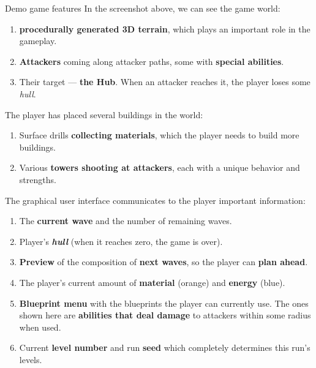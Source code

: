 \documentclass[portrait,fontscale=0.35,paperwidth=840mm,paperheight=1185mm]{baposter}
\begin{document}
\begin{poster}
\begin{posterbox}[column=0, name=game, below=design,headerColorOne=yellow!80!orange!95!black, boxColorOne=yellow!33]{Demo game features}
        In the screenshot above, we can see the game world:
        \begin{enumerate}[itemsep=-0.15cm,topsep=2pt]
            \item \textbf{procedurally generated 3D terrain}, which plays an important role in the gameplay.
            \item \textbf{Attackers} coming along attacker paths, some with \textbf{special abilities}.
            \item Their target --- \textbf{the Hub}. When an attacker reaches it, the player loses some \emph{hull}.
        \end{enumerate}
        The player has placed several buildings in the world:
        \begin{enumerate}[itemsep=-0.15cm,topsep=2pt,resume]
            \item Surface drills \textbf{collecting materials}, which the player needs to build more buildings.
            \item Various \textbf{towers shooting at attackers}, each with a unique behavior and strengths.
        \end{enumerate}
        The graphical user interface communicates to the player important information:
        \begin{enumerate}[itemsep=-0.15cm,topsep=2pt,resume]
            \item The \textbf{current wave} and the number of remaining waves.
            \item Player's \textbf{\emph{hull}} (when it reaches zero, the game is over).
            \item \textbf{Preview} of the composition of \textbf{next waves}, so the player can \textbf{plan ahead}.
            \item The player's current amount of \textbf{material} (orange) and \textbf{energy} (blue).
            \item \textbf{Blueprint menu} with the blueprints the player can currently use. The ones shown here are \textbf{abilities that deal damage} to attackers within some radius when used.
            \item Current \textbf{level number} and run \textbf{seed} which completely determines this run's levels.
        \end{enumerate}


\end{posterbox}
\end{poster}
\end{document}
